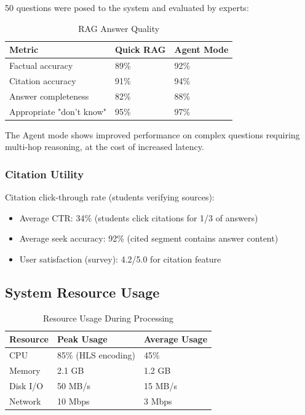 \documentclass[12pt,a4paper]{article}
\begin{document}
50 questions were posed to the system and evaluated by experts:

\begin{table}[H]
    \centering
    \caption{RAG Answer Quality}
    \begin{tabular}{@{}lll@{}}
        \toprule
        \textbf{Metric} & \textbf{Quick RAG} & \textbf{Agent Mode} \\ \midrule
        Factual accuracy & 89\% & 92\% \\
        Citation accuracy & 91\% & 94\% \\
        Answer completeness & 82\% & 88\% \\
        Appropriate "don't know" & 95\% & 97\% \\ \bottomrule
    \end{tabular}
\end{table}

The Agent mode shows improved performance on complex questions requiring multi-hop reasoning, at the cost of increased latency.

\subsubsection{Citation Utility}

Citation click-through rate (students verifying sources):

\begin{itemize}
    \item Average CTR: 34\% (students click citations for 1/3 of answers)
    \item Average seek accuracy: 92\% (cited segment contains answer content)
    \item User satisfaction (survey): 4.2/5.0 for citation feature
\end{itemize}

\subsection{System Resource Usage}

\begin{table}[H]
    \centering
    \caption{Resource Usage During Processing}
    \begin{tabular}{@{}lll@{}}
        \toprule
        \textbf{Resource} & \textbf{Peak Usage} & \textbf{Average Usage} \\ \midrule
        CPU & 85\% (HLS encoding) & 45\% \\
        Memory & 2.1 GB & 1.2 GB \\
        Disk I/O & 50 MB/s & 15 MB/s \\
        Network & 10 Mbps & 3 Mbps \\ \bottomrule
    \end{tabular}
\end{table}
\end{document}

